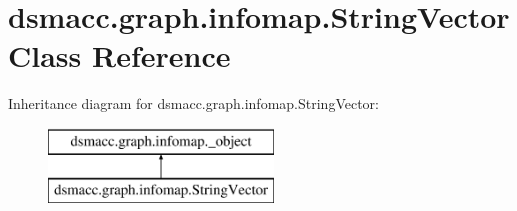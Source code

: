 \hypertarget{classdsmacc_1_1graph_1_1infomap_1_1StringVector}{}\section{dsmacc.\+graph.\+infomap.\+String\+Vector Class Reference}
\label{classdsmacc_1_1graph_1_1infomap_1_1StringVector}
Inheritance diagram for dsmacc.\+graph.\+infomap.\+String\+Vector\+:\begin{figure}[H]
\begin{center}
\leavevmode
\includegraphics[height=2.000000cm]{classdsmacc_1_1graph_1_1infomap_1_1StringVector}
\end{center}
\end{figure}
